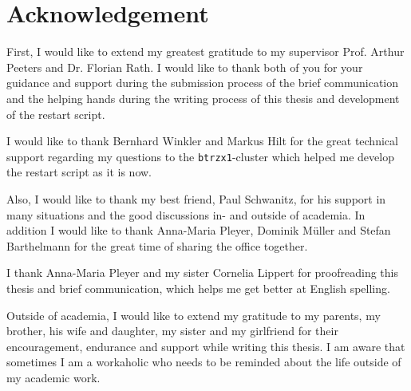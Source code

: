 \chapter*{Acknowledgement}
\label{chap:acknowledgement}

First, I would like to extend my greatest gratitude to my supervisor Prof. Arthur Peeters and Dr. Florian Rath. I would like to thank both of you for your guidance and support during the submission process of the brief communication and the helping hands during the writing process of this thesis and development of the restart script. \bigskip

I would like to thank Bernhard Winkler and Markus Hilt for the great technical support regarding my questions to the \texttt{btrzx1}-cluster which helped me develop the restart script as it is now. \bigskip

Also, I would like to thank my best friend, Paul Schwanitz, for his support in many situations and the good discussions in- and outside of academia. In addition I would like to thank Anna-Maria Pleyer, Dominik Müller and Stefan Barthelmann for the great time of sharing the office together. \bigskip

I thank Anna-Maria Pleyer and my sister Cornelia Lippert for proofreading this thesis and brief communication, which helps me get better at English spelling. \bigskip

Outside of academia, I would like to extend my gratitude to my parents, my brother, his wife and daughter, my sister and my girlfriend for their encouragement, endurance and support while writing this thesis. I am aware that sometimes I am a workaholic who needs to be reminded about the life outside of my academic work.